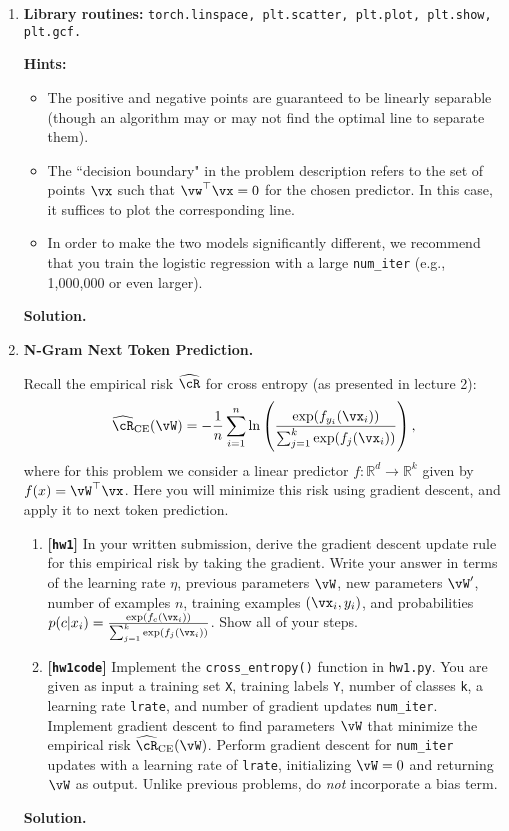 \documentclass{article}
\def\R{\mathbb{R}}
\def\hcR{\widehat{\cR}}
\def\CE{\text{CE}}
\def\hw{\textbf{[\texttt{hw1}]}\xspace}
\def\hwcode{\textbf{[\texttt{hw1code}]}\xspace}
\theoremstyle{definition}
\theoremstyle{remark}
\newenvironment{Q}
{%
  \clearpage
  \item
  }
  {%
    \phantom{s} %
    \bigskip
    \textbf{Solution.}
  }
\begin{document}
\begin{enumerate}[font={\Large\bfseries},left=0pt]
\begin{Q}
\begin{enumerate}
  \textbf{Library routines:} \texttt{torch.linspace, plt.scatter, plt.plot, plt.show, plt.gcf.}
  
  \textbf{Hints:}
  \begin{itemize}
      \item The positive and negative points are guaranteed to be linearly separable (though an algorithm may or may not find the optimal line to separate them).
      \item The ``decision boundary" in the problem description refers to the set of points $\vx$ such that $\vw^\top \vx = 0$ for the chosen predictor. In this case, it suffices to plot the corresponding line.
      \item In order to make the two models significantly different, we recommend that you train the logistic regression with a large \texttt{num\_iter} (e.g., 1,000,000 or even larger).
  \end{itemize}
  \end{enumerate}
  \end{Q}

  \begin{Q}
    \textbf{\Large N-Gram Next Token Prediction.}
  
    Recall the empirical risk $\hcR$ for cross entropy (as presented in lecture 2):
    \begin{align*}
    \hcR_{\CE}(\vW) = -\frac{1}{n} \sum_{i=1}^n \ln \left( \frac{\exp( f_{y_i}(\vx_i) )}{\sum_{j=1}^{k} \exp( f_j(\vx_i) )} \right),
    \end{align*}
    where for this problem we consider a linear predictor $f:\R^d \to \R^k$ given by $f(x) = \vW^\top\vx$.
    Here you will minimize this risk using gradient descent, and apply it to next token prediction.
    \begin{enumerate}
    \item \hw In your written submission, derive the gradient descent update rule for this empirical risk by taking the gradient.  Write your answer in terms of the learning rate $\eta$, previous parameters $\vW$, new parameters $\vW'$, number of examples $n$, training examples $(\vx_i, y_i)$, and probabilities $p(c|x_i) = \frac{\exp( f_c(\vx_i) )}{\sum_{j=1}^{k} \exp( f_j(\vx_i) )}$.  Show all of your steps.
    \item \hwcode Implement the \texttt{cross\_entropy()} function in \texttt{hw1.py}.
    You are given as input a training set \texttt{X}, training labels \texttt{Y},
    number of classes \texttt{k}, a learning rate \texttt{lrate}, and number of gradient updates \texttt{num\_iter}.
    Implement gradient descent to find parameters $\vW$ that minimize the empirical risk $\hcR_{\CE}(\vW)$.
    Perform gradient descent for \texttt{num\_iter} updates with a learning rate of \texttt{lrate}, initializing $\vW = 0$ and returning $\vW$ as output.
    Unlike previous problems, do \emph{not} incorporate a bias term.
    

\end{enumerate}
\end{Q}
\end{enumerate}
\end{document}
